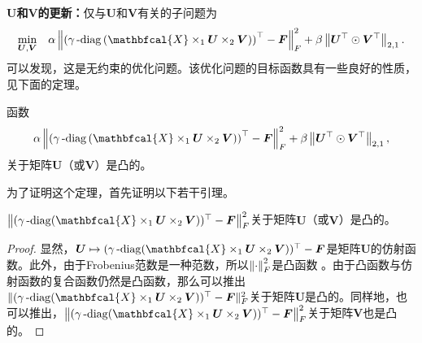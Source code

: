 \textbf{$\boldsymbol{U}$和$\boldsymbol{V}$的更新：}仅与$\boldsymbol{U}$和$\boldsymbol{V}$有关的子问题为
\begin{equation*}
    \underset{\mathclap{\boldsymbol{U},\boldsymbol{V}}}{\min} \quad \alpha\norm{\left(\mydiag\left(\mathbfcal{X}\times_{1}\boldsymbol{U}\times_{2}\boldsymbol{V}\right)\right)^{\top} - \boldsymbol{F}}_{F}^{2} + \beta \norm{\boldsymbol{U}^{\top}\odot\boldsymbol{V}^{\top}}_{2,1}.
\end{equation*}
可以发现，这是无约束的优化问题。该优化问题的目标函数具有一些良好的性质，见下面的定理。
\begin{theorem}\label{thm:UVcvx}\kaishu
    函数
    \begin{equation*}
        \alpha\norm{\left(\mydiag\left(\mathbfcal{X}\times_{1}\boldsymbol{U}\times_{2}\boldsymbol{V}\right)\right)^{\top} - \boldsymbol{F}}_{F}^{2} + \beta \norm{\boldsymbol{U}^{\top}\odot\boldsymbol{V}^{\top}}_{2,1},
    \end{equation*}
    关于矩阵$\boldsymbol{U}$（或$\boldsymbol{V}$）是凸的。
\end{theorem}
\noindent 为了证明这个定理，首先证明以下若干引理。
\begin{lemma}\label{lemma:UVcvx1}\kaishu
    $\norm{(\mydiag(\mathbfcal{X}\times_{1}\boldsymbol{U}\times_{2}\boldsymbol{V}))^{\top} - \boldsymbol{F}}_{F}^{2}$关于矩阵$\boldsymbol{U}$（或$\boldsymbol{V}$）是凸的。
\end{lemma}

\begin{proof}
    显然，$\boldsymbol{U}\mapsto(\mydiag(\mathbfcal{X}\times_{1}\boldsymbol{U}\times_{2}\boldsymbol{V}))^{\top} - \boldsymbol{F}$是矩阵$\boldsymbol{U}$的仿射函数。此外，由于Frobenius范数是一种范数，所以$\left\lVert\cdot\right\rVert_{F}^{2}$是凸函数
    。由于凸函数与仿射函数的复合函数仍然是凸函数，那么可以推出$\lVert(\mydiag(\mathbfcal{X}\times_{1}\boldsymbol{U}\times_{2}\boldsymbol{V}))^{\top} \allowbreak - \boldsymbol{F}\rVert_{F}^{2}$关于矩阵$\boldsymbol{U}$是凸的。同样地，也可以推出，$\norm{(\mydiag(\mathbfcal{X}\times_{1}\boldsymbol{U}\times_{2}\boldsymbol{V}))^{\top} - \boldsymbol{F}}_{F}^{2}$关于矩阵$\boldsymbol{V}$也是凸的。
\end{proof}\vspace{0.5em}

